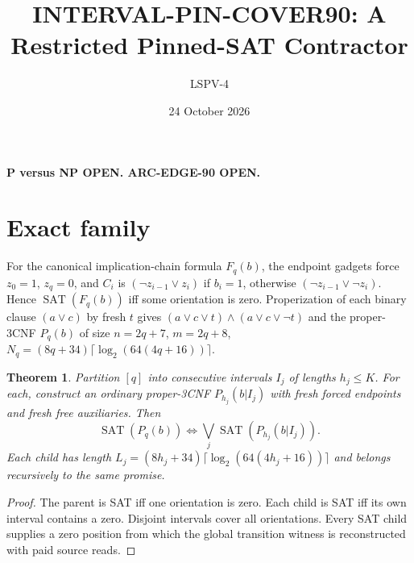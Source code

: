 \documentclass{article}
\title{INTERVAL-PIN-COVER90: A Restricted Pinned-SAT Contractor}
\author{LSPV-4}
\date{24 October 2026}
\newtheorem{theorem}{Theorem}
\begin{document}
\maketitle
\begin{center}\textbf{P versus NP OPEN. ARC-EDGE-90 OPEN.}\end{center}
\section{Exact family}
For the canonical implication-chain formula $F_q(b)$, the endpoint gadgets force $z_0=1$, $z_q=0$, and $C_i$ is $(\neg z_{i-1}\lor z_i)$ if $b_i=1$, otherwise $(\neg z_{i-1}\lor\neg z_i)$. Hence $\operatorname{SAT}(F_q(b))$ iff some orientation is zero. Properization of each binary clause $(a\lor c)$ by fresh $t$ gives $(a\lor c\lor t)\land(a\lor c\lor\neg t)$ and the proper-3CNF $P_q(b)$ of size $n=2q+7$, $m=2q+8$, $N_q=(8q+34)\lceil\log_2(64(4q+16))\rceil$.
\begin{theorem}
Partition $[q]$ into consecutive intervals $I_j$ of lengths $h_j\le K$. For each, construct an ordinary proper-3CNF $P_{h_j}(b|I_j)$ with fresh forced endpoints and fresh free auxiliaries. Then
\[
\operatorname{SAT}(P_q(b))\iff\bigvee_j\operatorname{SAT}(P_{h_j}(b|I_j)).
\]
Each child has length $L_j=(8h_j+34)\lceil\log_2(64(4h_j+16))\rceil$ and belongs recursively to the same promise.
\end{theorem}
\begin{proof}The parent is SAT iff one orientation is zero. Each child is SAT iff its own interval contains a zero. Disjoint intervals cover all orientations. Every SAT child supplies a zero position from which the global transition witness is reconstructed with paid source reads.\end{proof}
\end{document}

